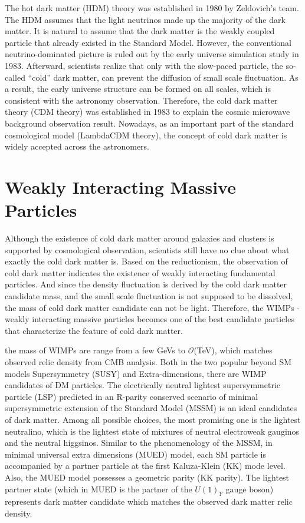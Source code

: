 \par The hot dark matter (HDM) theory\cite{Zeldovich:1982zz} was established in 1980 by Zeldovich's team. The HDM assumes that the light neutrinos made up the majority of the dark matter. It is natural to assume that the dark matter is the weakly coupled particle that already existed in the Standard Model. However, the conventional neutrino-dominated picture is ruled out by the early universe simulation study in 1983\cite{White:1984yj}. Afterward, scientists realize that only with the slow-paced particle, the so-called ``cold'' dark matter, can prevent the diffusion of small scale fluctuation. As a result, the early universe structure can be formed on all scales, which is consistent with the astronomy observation. Therefore, the cold dark matter theory (CDM theory)\cite{PhysRevLett.48.223} was established in 1983 to explain the cosmic microwave background observation result. Nowadays, as an important part of the standard cosmological model (LambdaCDM theory), the concept of cold dark matter is widely accepted across the astronomers. 

\section{Weakly Interacting Massive Particles}
\label{sec:dms2}
\par Although the existence of cold dark matter around galaxies and clusters is supported by cosmological observation, scientists still have no clue about what exactly the cold dark matter is. Based on the reductionism, the observation of cold dark matter indicates the existence of weakly interacting fundamental particles. And since the density fluctuation is derived by the cold dark matter candidate mass, and the small scale fluctuation is not supposed to be dissolved, the mass of cold dark matter candidate can not be light. Therefore, the WIMPs - weakly interacting massive particles becomes one of the best candidate particles that characterize the feature of cold dark matter.

\par the mass of WIMPs are range from a few GeVs to $\mathcal{O}$(TeV), which matches observed relic density from CMB analysis. Both in the two popular beyond SM models Supersymmetry (SUSY) and Extra-dimensions, there are WIMP candidates of DM particles. The electrically neutral lightest supersymmetric particle (LSP) predicted in an R-parity conserved scenario of minimal supersymmetric extension of the Standard Model (MSSM) is an ideal candidates of dark matter. Among all possible choices, the most promising one is the lightest neutralino, which is the lightest state of mixtures of neutral electroweak gauginos and the neutral higgsinos\cite{Feng:2010gw}. Similar to the phenomenology of the MSSM, in minimal universal extra dimensions (MUED) model, each SM particle is accompanied by a partner particle at the first Kaluza-Klein (KK) mode level. Also, the MUED model possesses a geometric parity (KK parity). The lightest partner state (which in MUED is the partner of the $U(1)_Y$ gauge boson) represents dark matter candidate which matches the observed dark matter relic density\cite{Servant:2002aq}.

